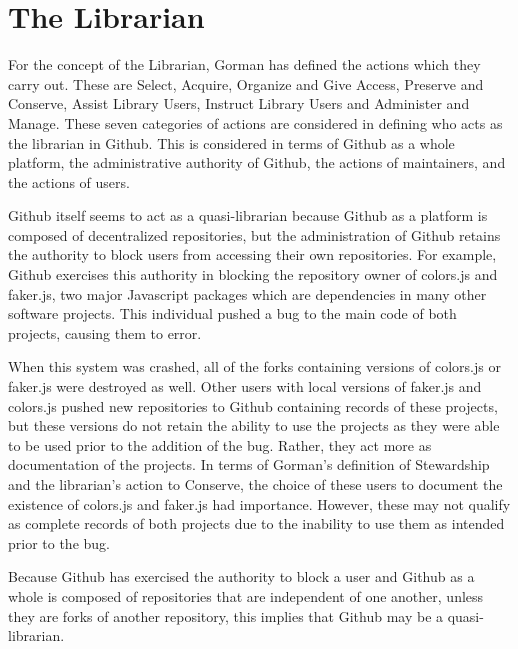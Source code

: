 \section{The Librarian}
\label{sec:librarian}

For the concept of the Librarian, Gorman has defined the actions which they carry out. These are Select, Acquire, Organize and Give Access, Preserve and Conserve, Assist Library Users, Instruct Library Users and Administer and Manage. These seven categories of actions are considered in defining who acts as the librarian in Github. This is considered in terms of Github as a whole platform, the administrative authority of Github, the actions of maintainers, and the actions of users. 

Github itself seems to act as a quasi-librarian because Github as a platform is composed of decentralized repositories, but the administration of Github retains the authority to block users from accessing their own repositories. For example, Github exercises this authority in blocking the repository owner of colors.js and faker.js, two major Javascript packages which are dependencies in many other software projects. This individual pushed a bug to the main code of both projects, causing them to error. 

When this system was crashed, all of the forks containing versions of colors.js or faker.js were destroyed as well. Other users with local versions of faker.js and colors.js pushed new repositories to Github containing records of these projects, but these versions do not retain the ability to use the projects as they were able to be used prior to the addition of the bug. Rather, they act more as documentation of the projects. In terms of Gorman's definition of Stewardship and the librarian's action to Conserve, the choice of these users to document the existence of colors.js and faker.js had importance. However, these may not qualify as complete records of both projects due to the inability to use them as intended prior to the bug. 

Because Github has exercised the authority to block a user and Github as a whole is composed of repositories that are independent of one another, unless they are forks of another repository, this implies that Github may be a quasi-librarian.

